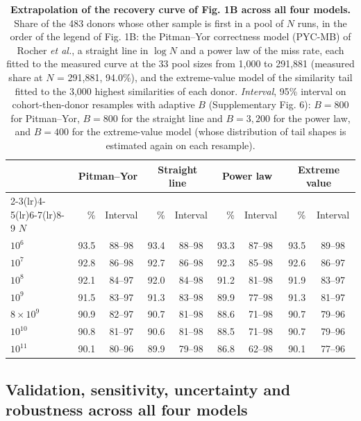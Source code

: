 \documentclass[11pt,a4paper]{article}
\begin{document}
\setcounter{table}{14}
\begin{table}[!htbp]\centering\small\setlength{\tabcolsep}{4pt}
\caption[Extrapolation of the recovery curve of Fig. 1B across all four models]{\textbf{Extrapolation of the recovery curve of Fig. 1B across all four models.} Share of the 483 donors whose other sample is first in a pool of $N$ runs, in the order of the legend of Fig. 1B: the Pitman--Yor correctness model (PYC-MB) of Rocher \textit{et al.}\cite{rocher2025}, a straight line in $\log N$ and a power law of the miss rate\cite{grother2019}, each fitted to the measured curve at the 33 pool sizes from 1,000 to 291,881 (measured share at $N$ = 291,881, 94.0\%), and the extreme-value model of the similarity tail fitted to the 3,000 highest similarities of each donor. \textit{Interval}, 95\% interval on cohort-then-donor resamples with adaptive $B$ (Supplementary Fig. 6): $B = 800$ for Pitman--Yor, $B = 800$ for the straight line and $B = 3{,}200$ for the power law, and $B = 400$ for the extreme-value model (whose distribution of tail shapes is estimated again on each resample).}
\begin{tabular}{lrcrcrcrc}
\toprule
 & \multicolumn{2}{c}{Pitman--Yor} & \multicolumn{2}{c}{Straight line} & \multicolumn{2}{c}{Power law} & \multicolumn{2}{c}{Extreme value} \\
\cmidrule(lr){2-3}\cmidrule(lr){4-5}\cmidrule(lr){6-7}\cmidrule(lr){8-9}
$N$ & \% & Interval & \% & Interval & \% & Interval & \% & Interval \\
\midrule
$10^6$ & 93.5 & 88--98 & 93.4 & 88--98 & 93.3 & 87--98 & 93.5 & 89--98 \\
$10^7$ & 92.8 & 86--98 & 92.7 & 86--98 & 92.3 & 85--98 & 92.6 & 86--97 \\
$10^8$ & 92.1 & 84--97 & 92.0 & 84--98 & 91.2 & 81--98 & 91.9 & 83--97 \\
$10^9$ & 91.5 & 83--97 & 91.3 & 83--98 & 89.9 & 77--98 & 91.3 & 81--97 \\
$8\times10^9$ & 90.9 & 82--97 & 90.7 & 81--98 & 88.6 & 71--98 & 90.7 & 79--96 \\
$10^{10}$ & 90.8 & 81--97 & 90.6 & 81--98 & 88.5 & 71--98 & 90.7 & 79--96 \\
$10^{11}$ & 90.1 & 80--96 & 89.9 & 79--98 & 86.8 & 62--98 & 90.1 & 77--96 \\
\bottomrule
\end{tabular}
\end{table}

\subsection*{Validation, sensitivity, uncertainty and robustness across all four models}
\end{document}

